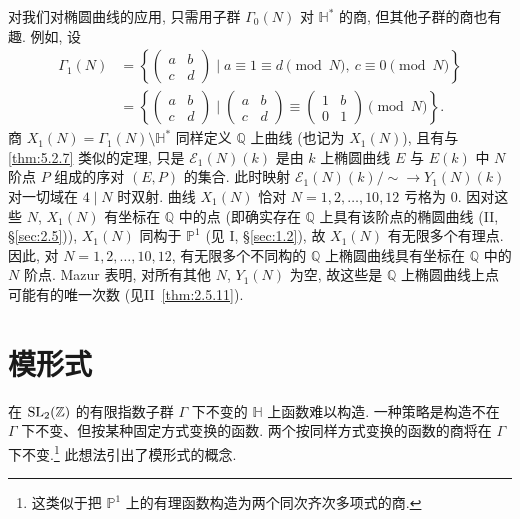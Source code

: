 \begin{aside} \label{thm:5.2.8} 
对我们对椭圆曲线的应用, 只需用子群 $\Gamma_0(N)$ 对 $\mathbb{H}^*$ 的商, 但其他子群的商也有趣. 例如, 设
\begin{align*}
  \Gamma_1(N) & = \left\{\begin{pmatrix}a & b\\ c & d\end{pmatrix}\;\Big|\; a\equiv 1\equiv d\pmod{N}, \ c\equiv 0\pmod{N}\right\}
  \\ & = \left\{\begin{pmatrix}a & b\\ c & d\end{pmatrix}\;\Big|\; \begin{pmatrix}a & b\\ c & d\end{pmatrix}\equiv\begin{pmatrix}1 & b\\ 0 & 1\end{pmatrix}\pmod{N}\right\}.
\end{align*}
商 $X_1(N) = \Gamma_1(N)\setminus\mathbb{H}^*$ 同样定义 $\mathbb{Q}$ 上曲线 (也记为 $X_1(N)$), 且有与 \ref{thm:5.2.7} 类似的定理, 只是 $\mathcal{E}_1(N)(k)$ 是由 $k$ 上椭圆曲线 $E$ 与 $E(k)$ 中 $N$ 阶点 $P$ 组成的序对 $(E, P)$ 的集合. 此时映射 $\mathcal{E}_1(N)(k)/{\sim}\to Y_1(N)(k)$ 对一切域在 $4\mid N$ 时双射. 曲线 $X_1(N)$ 恰对 $N = 1, 2, \dots, 10, 12$ 亏格为 $0$. 因对这些 $N$, $X_1(N)$ 有坐标在 $\mathbb{Q}$ 中的点 (即确实存在 $\mathbb{Q}$ 上具有该阶点的椭圆曲线 (II, \S\ref{sec:2.5})), $X_1(N)$ 同构于 $\mathbb{P}^1$ (见 I, \S\ref{sec:1.2}), 故 $X_1(N)$ 有无限多个有理点. 因此, 对 $N = 1, 2, \dots, 10, 12$, 有无限多个不同构的 $\mathbb{Q}$ 上椭圆曲线具有坐标在 $\mathbb{Q}$ 中的 $N$ 阶点. Mazur 表明, 对所有其他 $N$, $Y_1(N)$ 为空, 故这些是 $\mathbb{Q}$ 上椭圆曲线上点可能有的唯一次数 (见II~\ref{thm:2.5.11}).
\end{aside}

\section{模形式}\label{sec:5.3}

在 $\operatorname{SL}_2(\mathbb{Z})$ 的有限指数子群 $\Gamma$ 下不变的 $\mathbb{H}$ 上函数难以构造. 一种策略是构造不在 $\Gamma$ 下不变、但按某种固定方式变换的函数. 两个按同样方式变换的函数的商将在 $\Gamma$ 下不变.\footnote{这类似于把 $\mathbb{P}^1$ 上的有理函数构造为两个同次齐次多项式的商.} 此想法引出了模形式的概念.

